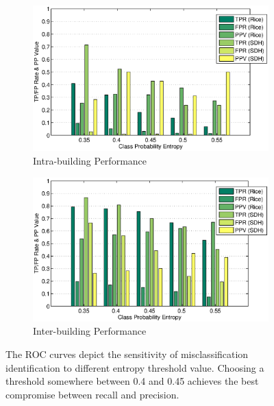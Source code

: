 \begin{figure}[ht!]
\centering
	\begin{subfigure}{0.48\textwidth}
                \centering
		\includegraphics[width=\textwidth]{./fig/roc_intra.eps}
                \caption{Intra-building Performance}
                \label{fig:roc_intra}
	\end{subfigure}
	\begin{subfigure}{0.48\textwidth}
                \centering
		\includegraphics[width=\textwidth]{./fig/roc_inter.eps}
                \caption{Inter-building Performance}
                \label{fig:roc_inter}
	\end{subfigure}
\caption{The ROC curves depict the sensitivity of misclassification identification to different entropy threshold value. Choosing a threshold somewhere between 0.4 and 0.45 achieves the best compromise between recall and precision. }
\label{fig:roc}
\end{figure}

